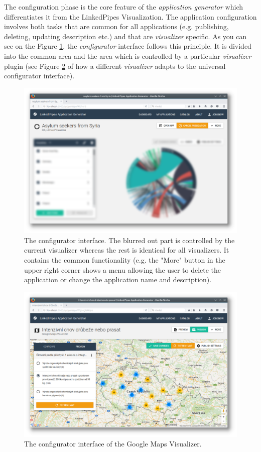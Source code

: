 The configuration phase is the core feature of the \emph{application generator} which differentiates it from the LinkedPipes Visualization. The application configuration involves both tasks that are common for all applications (e.g. publishing, deleting, updating description etc.) and that are \emph{visualizer} specific. As you can see on the Figure \ref{fig:configurator}, the \emph{configurator} interface follows this principle. It is divided into the common area and the area which is controlled by a particular \emph{visualizer} plugin (see Figure \ref{fig:google_maps_visualizer} of how a different \emph{visualizer} adapts to the universal configurator interface). 

\begin{figure}
	\centering
	\includegraphics[width=145mm]{img/05_configurator.png}
	\caption{The configurator interface. The blurred out part is controlled by the current visualizer whereas the rest is identical for all visualizers. It contains the common functionality (e.g. the "More" button in the upper right corner shows a menu allowing the user to delete the application or change the application name and description).}
    \label{fig:configurator}
\end{figure}

\begin{figure}
	\centering
	\includegraphics[width=145mm]{img/05_google_maps_visualizer.png}
	\caption{The configurator interface of the Google Maps Visualizer.}
    \label{fig:google_maps_visualizer}
\end{figure}

